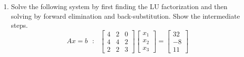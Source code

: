 \documentclass[10pt,letterpaper]{article}
\begin{document}
\begin{enumerate}
\item Solve the following system by first finding the LU factorization and then solving by forward elimination and back-substitution. Show the intermediate steps. 
$$Ax = b\ \ \ :\ \ \ \begin{bmatrix}
4 & 2 & 0 \\
4 & 4 & 2 \\
2 & 2 & 3 
\end{bmatrix}\begin{bmatrix}
x_{1} \\
x_{2} \\
x_{3} 
\end{bmatrix} = \begin{bmatrix}
32 \\
-8 \\
11 
\end{bmatrix}$$


\end{enumerate}
\end{document}
